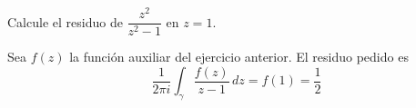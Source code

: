 \begin{exercise}
Calcule el residuo de $\dfrac {z^2} {z^2 - 1}$ en $z = 1$.
\end{exercise}

\begin{solution}
Sea $f(z)$ la función auxiliar del ejercicio anterior. El residuo pedido es
$$\frac 1 {2\pi i} \int_\gamma \frac {f(z)} {z - 1} \, dz = f(1) = \frac 12$$
\end{solution}
